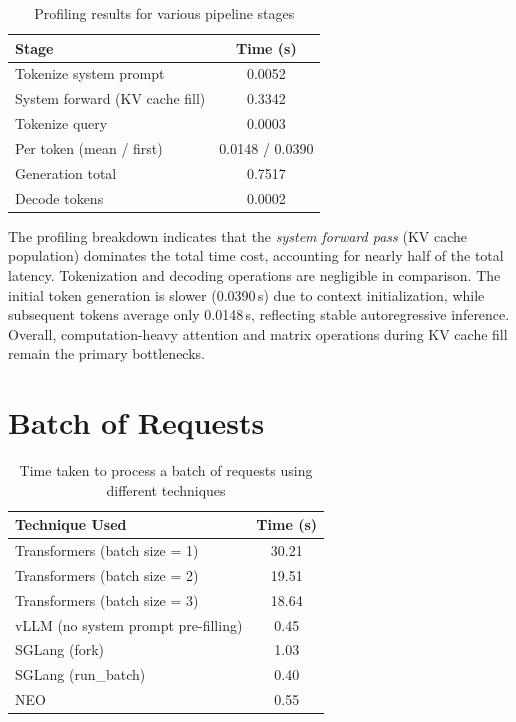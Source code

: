 \begin{table}
\vspace{-10pt}
\centering
\begin{tabular}{|l|c|}
\hline
\textbf{Stage} & \textbf{Time (s)} \\
\hline
Tokenize system prompt & 0.0052 \\
System forward (KV cache fill) & 0.3342 \\
Tokenize query & 0.0003 \\
Per token (mean / first) & 0.0148 / 0.0390 \\
Generation total & 0.7517 \\
Decode tokens & 0.0002 \\
\hline
\end{tabular}
\caption{Profiling results for various pipeline stages}
\vspace{-10pt}
\end{table}

The profiling breakdown indicates that the \textit{system forward pass} (KV cache population) dominates the total time cost, accounting for nearly half of the total latency. Tokenization and decoding operations are negligible in comparison. The initial token generation is slower (0.0390\,s) due to context initialization, while subsequent tokens average only 0.0148\,s, reflecting stable autoregressive inference. Overall, computation-heavy attention and matrix operations during KV cache fill remain the primary bottlenecks.



\section{Batch of Requests} 

\begin{table}
\vspace{-10pt}
\centering
\begin{tabular}{|l|c|}
\hline
\textbf{Technique Used} & \textbf{Time (s)} \\
\hline
Transformers (batch size = 1) & 30.21 \\
Transformers (batch size = 2) & 19.51 \\
Transformers (batch size = 3) & 18.64 \\
vLLM (no system prompt pre-filling) & 0.45 \\
SGLang (fork) & 1.03 \\
SGLang (run\_batch) & 0.40 \\
NEO & 0.55 \\
\hline
\end{tabular}
\caption{Time taken to process a batch of requests using different techniques}
\vspace{-10pt}
\end{table}

